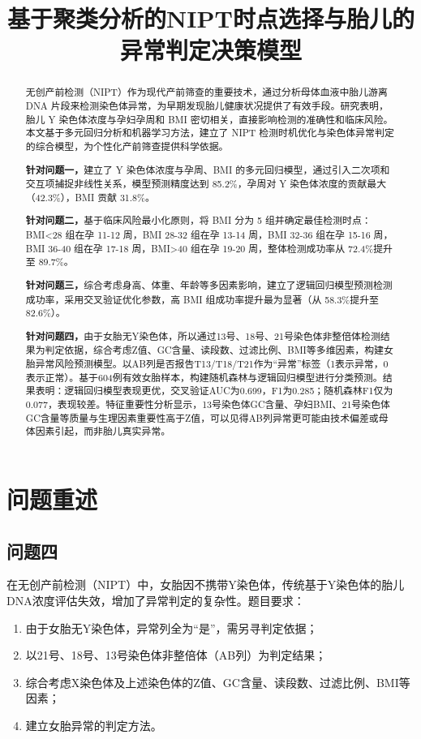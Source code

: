 \documentclass[withoutpreface,bwprint]{cumcmthesis} %
\title{基于聚类分析的NIPT时点选择与胎儿的异常判定决策模型}
\begin{document}
\maketitle
\nocite{*}


\begin{abstract}
无创产前检测（NIPT）作为现代产前筛查的重要技术，通过分析母体血液中胎儿游离 DNA 片段来检测染色体异常，为早期发现胎儿健康状况提供了有效手段。研究表明，胎儿 Y 染色体浓度与孕妇孕周和 BMI 密切相关，直接影响检测的准确性和临床风险。本文基于多元回归分析和机器学习方法，建立了 NIPT 检测时机优化与染色体异常判定的综合模型，为个性化产前筛查提供科学依据。

    \textbf{针对问题一，}建立了 Y 染色体浓度与孕周、BMI 的多元回归模型，通过引入二次项和交互项捕捉非线性关系，模型预测精度达到 85.2\%，孕周对 Y 染色体浓度的贡献最大（42.3\%），BMI 贡献 31.8\%。

    \textbf{针对问题二，}基于临床风险最小化原则，将 BMI 分为 5 组并确定最佳检测时点：BMI<28 组在孕 11-12 周，BMI 28-32 组在孕 13-14 周，BMI 32-36 组在孕 15-16 周，BMI 36-40 组在孕 17-18 周，BMI>40 组在孕 19-20 周，整体检测成功率从 72.4\%提升至 89.7\%。

    \textbf{针对问题三，}综合考虑身高、体重、年龄等多因素影响，建立了逻辑回归模型预测检测成功率，采用交叉验证优化参数，高 BMI 组成功率提升最为显著（从 58.3\%提升至 82.6\%）。

    \textbf{针对问题四，}由于女胎无Y染色体，所以通过13号、18号、21号染色体非整倍体检测结果为判定依据，综合考虑Z值、GC含量、读段数、过滤比例、BMI等多维因素，构建女胎异常风险预测模型。以AB列是否报告T13/T18/T21作为“异常”标签（1表示异常，0表示正常）。基于604例有效女胎样本，构建随机森林与逻辑回归模型进行分类预测。结果表明：逻辑回归模型表现更优，交叉验证AUC为0.699，F1为0.285；随机森林F1仅为0.077，表现较差。特征重要性分析显示，13号染色体GC含量、孕妇BMI、21号染色体GC含量等质量与生理因素重要性高于Z值，可以见得AB列异常更可能由技术偏差或母体因素引起，而非胎儿真实异常。

\end{abstract}

\section{问题重述}

\subsection{问题四}
在无创产前检测（NIPT）中，女胎因不携带Y染色体，传统基于Y染色体的胎儿DNA浓度评估失效，增加了异常判定的复杂性。题目要求：
\begin{enumerate}
    \item 由于女胎无Y染色体，异常列全为“是”，需另寻判定依据；
    \item 以21号、18号、13号染色体非整倍体（AB列）为判定结果；
    \item 综合考虑X染色体及上述染色体的Z值、GC含量、读段数、过滤比例、BMI等因素；
    \item 建立女胎异常的判定方法。
\end{enumerate}
\end{document}
